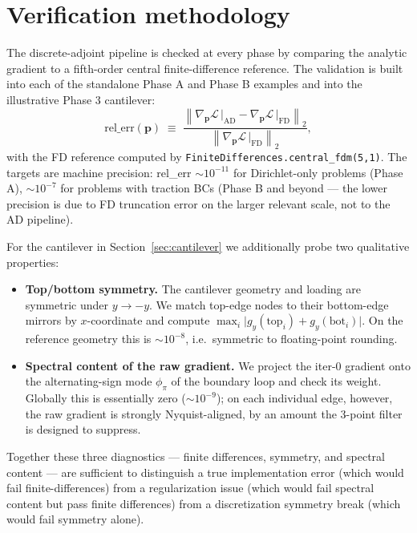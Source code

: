 \documentclass[11pt,a4paper]{article}
\newcommand{\vect}[1]{\boldsymbol{#1}}
\newcommand{\pts}{\vect{p}}
\newcommand{\norm}[1]{\left\lVert#1\right\rVert}
\newcommand{\Loss}{\mathcal{L}}
\begin{document}
\section{Verification methodology}
\label{sec:verification}

The discrete-adjoint pipeline is checked at every phase by
comparing the analytic gradient to a fifth-order central
finite-difference reference. The validation is built into each of
the standalone Phase A and Phase B examples and into the
illustrative Phase 3 cantilever:
\begin{equation}
  \text{rel\_err}(\pts)
  \;\equiv\;
  \frac{\norm{\nabla_{\pts}\Loss\,\big|_{\text{AD}}
              - \nabla_{\pts}\Loss\,\big|_{\text{FD}}}_2}{\norm{\nabla_{\pts}\Loss\,\big|_{\text{FD}}}_2},
\end{equation}
with the FD reference computed by
\texttt{FiniteDifferences.central\_fdm(5,1)}. The targets are
machine precision: rel\_err $\sim 10^{-11}$ for Dirichlet-only
problems (Phase A), $\sim 10^{-7}$ for problems with traction BCs
(Phase B and beyond --- the lower precision is due to FD truncation
error on the larger relevant scale, not to the AD pipeline).

For the cantilever in Section~\ref{sec:cantilever} we additionally
probe two qualitative properties:
\begin{itemize}[leftmargin=2em]
  \item \textbf{Top/bottom symmetry.}\;
        The cantilever geometry and loading are symmetric under
        $y \to -y$. We match top-edge nodes to their bottom-edge
        mirrors by $x$-coordinate and compute
        $\max_i \lvert g_y(\text{top}_i) + g_y(\text{bot}_i)\rvert$.
        On the reference geometry this is $\sim 10^{-8}$, i.e.\
        symmetric to floating-point rounding.
  \item \textbf{Spectral content of the raw gradient.}\;
        We project the iter-0 gradient onto the alternating-sign
        mode $\phi_\pi$ of the boundary loop and check its weight.
        Globally this is essentially zero ($\sim 10^{-9}$); on
        each individual edge, however, the raw gradient is
        strongly Nyquist-aligned, by an amount the 3-point filter
        is designed to suppress.
\end{itemize}
Together these three diagnostics --- finite differences, symmetry,
and spectral content --- are sufficient to distinguish a true
implementation error (which would fail finite-differences) from a
regularization issue (which would fail spectral content but pass
finite differences) from a discretization symmetry break (which
would fail symmetry alone).
\end{document}
